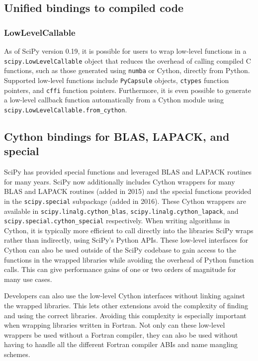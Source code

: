\documentclass[fleqn,10pt]{wlscirep}
\begin{document}


\subsection*{Unified bindings to compiled code}

\subsubsection*{LowLevelCallable}

As of SciPy version 0.19, it is possible for users to wrap low-level functions
in a \texttt{scipy.LowLevelCallable} object that reduces the overhead of
calling compiled C functions, such as those generated using \texttt{numba}
or Cython, directly from Python.
Supported low-level functions include \texttt{PyCapsule}
objects, \texttt{ctypes} function pointers, and \texttt{cffi} function pointers.
Furthermore, it is even possible to generate a low-level callback function
automatically from a Cython module using \texttt{scipy.LowLevelCallable.from\_cython}.

\subsection*{Cython bindings for BLAS, LAPACK, and special}

SciPy has provided special functions and leveraged BLAS and
LAPACK\cite{LAPACK} routines for many years. SciPy now additionally
includes Cython\cite{behnel2011cython} wrappers for
many BLAS and LAPACK routines (added in 2015) and the special functions 
provided in the \texttt{scipy.{\allowbreak}special} subpackage (added in 2016).
These Cython wrappers are available in 
\texttt{scipy.{\allowbreak}linalg.{\allowbreak}cython\_blas},
\texttt{scipy.{\allowbreak}linalg.{\allowbreak}cython\_lapack}, and
\texttt{scipy.{\allowbreak}special.{\allowbreak}cython\_special} respectively.
When writing algorithms in Cython, it is typically more efficient to call
directly into the libraries SciPy wraps rather than indirectly, using SciPy's
Python APIs.  These low-level interfaces for Cython can also be used outside of
the SciPy codebase to gain access to the functions in the wrapped libraries
while avoiding the overhead of Python function calls.  This can give
performance gains of one or two orders of magnitude for many use cases.

Developers can also use the low-level Cython interfaces without linking against
the wrapped libraries\cite{blas-lapack-wrappers-scipy-2015}.  This lets other
extensions avoid the complexity of finding and using the correct libraries.
Avoiding this complexity is especially important when wrapping libraries
written in Fortran.  Not only can these low-level wrappers be used without a
Fortran compiler, they can also be used without having to handle all the
different Fortran compiler ABIs and name mangling schemes.
\end{document}
